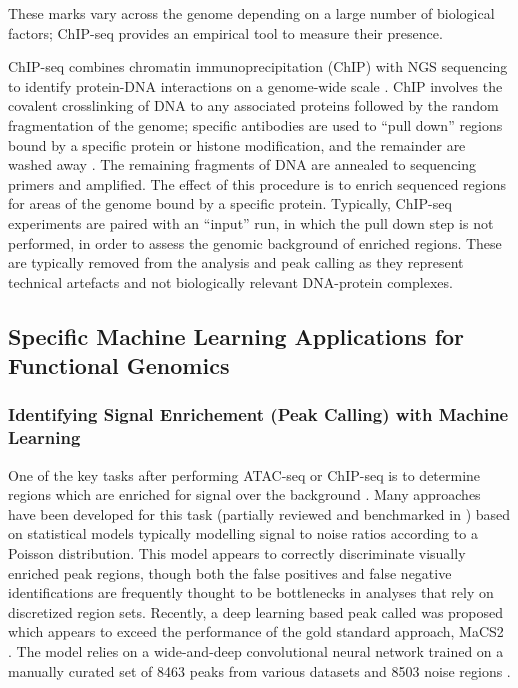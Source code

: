 These marks vary across the genome depending on a large number of biological factors; ChIP-seq provides an empirical tool to measure their presence. 

ChIP-seq combines chromatin immunoprecipitation (ChIP) with NGS sequencing to identify protein-DNA interactions on a genome-wide scale \cite{Park2009a}. ChIP involves the covalent crosslinking of DNA to any associated proteins followed by the random fragmentation of the genome; specific antibodies are used to ``pull down'' regions bound by a specific protein or histone modification, and the remainder are washed away \cite{Nakato2021,Furey2012}. The remaining fragments of DNA are annealed to sequencing primers and amplified. The effect of this procedure is to enrich sequenced regions for areas of the genome bound by a specific protein. Typically, ChIP-seq experiments are paired with an ``input'' run, in which the pull down step is not performed, in order to assess the genomic background of enriched regions. These are typically removed from the analysis and peak calling as they represent technical artefacts and not biologically relevant DNA-protein complexes. 

\subsection{Specific Machine Learning Applications for Functional Genomics}

\subsubsection{Identifying Signal Enrichement (Peak Calling) with Machine Learning} \label{intro:pc}

One of the key tasks after performing ATAC-seq or ChIP-seq is to determine regions which are enriched for signal over the background \cite{Yan2020a}. Many approaches have been developed for this task (partially reviewed and benchmarked in \textcite{R2017}) based on statistical models typically modelling signal to noise ratios according to a Poisson distribution. This model appears to correctly discriminate visually enriched peak regions, though both the false positives and false negative identifications are frequently thought to be bottlenecks in analyses that rely on discretized region sets. Recently, a deep learning based peak called was proposed which appears to exceed the performance of the gold standard approach, MaCS2 \cite{Hentges2021a,Zhang2008,Gaspar2018}. The model relies on a wide-and-deep convolutional neural network trained on a manually curated set of 8463 peaks from various \textcite{ENCODEProjectConsortium2012} datasets and 8503 noise regions \cite{Cheng2016,Hentges2021a}. 

